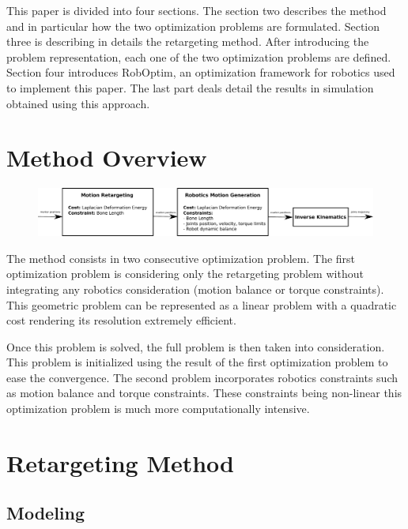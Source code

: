 \documentclass[letterpaper, 10 pt, conference]{ieeeconf}  %
\begin{document}
This paper is divided into four sections. The section two describes
the method and in particular how the two optimization problems are
formulated. Section three is describing in details the retargeting
method. After introducing the problem representation, each one of the
two optimization problems are defined. Section four introduces
RobOptim, an optimization framework for robotics used to implement
this paper. The last part deals detail the results in simulation
obtained using this approach.


\section{Method Overview}
\label{sec:overview}

\begin{figure}[ht]
  \includegraphics[width=\linewidth]{figure/architecture.pdf}
\end{figure}


The method consists in two consecutive optimization problem. The first
optimization problem is considering only the retargeting problem
without integrating any robotics consideration (motion balance or
torque constraints). This geometric problem can be represented as a
linear problem with a quadratic cost rendering its resolution
extremely efficient.

Once this problem is solved, the full problem is then taken into
consideration. This problem is initialized using the result of the
first optimization problem to ease the convergence. The second problem
incorporates robotics constraints such as motion balance and torque
constraints. These constraints being non-linear this optimization
problem is much more computationally intensive.



\section{Retargeting Method}
\label{sec:retargeting}

\subsection{Modeling}
\end{document}
